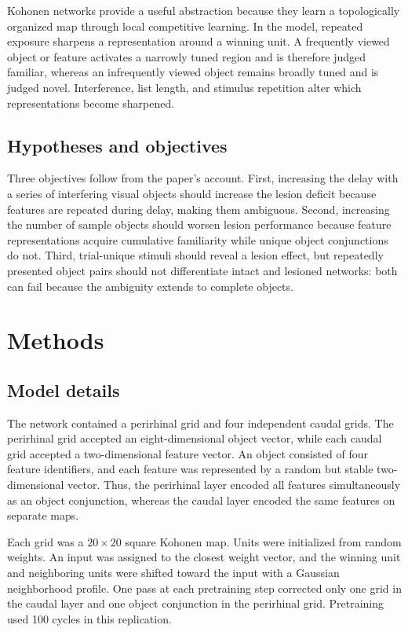 \documentclass[11pt]{article}
\begin{document}
Kohonen networks provide a useful abstraction because they learn a topologically organized map through local competitive learning. In the model, repeated exposure sharpens a representation around a winning unit. A frequently viewed object or feature activates a narrowly tuned region and is therefore judged familiar, whereas an infrequently viewed object remains broadly tuned and is judged novel. Interference, list length, and stimulus repetition alter which representations become sharpened.

\subsection{Hypotheses and objectives}
Three objectives follow from the paper's account. First, increasing the delay with a series of interfering visual objects should increase the lesion deficit because features are repeated during delay, making them ambiguous. Second, increasing the number of sample objects should worsen lesion performance because feature representations acquire cumulative familiarity while unique object conjunctions do not. Third, trial-unique stimuli should reveal a lesion effect, but repeatedly presented object pairs should not differentiate intact and lesioned networks: both can fail because the ambiguity extends to complete objects.

\section{Methods}
\subsection{Model details}
The network contained a perirhinal grid and four independent caudal grids. The perirhinal grid accepted an eight-dimensional object vector, while each caudal grid accepted a two-dimensional feature vector. An object consisted of four feature identifiers, and each feature was represented by a random but stable two-dimensional vector. Thus, the perirhinal layer encoded all features simultaneously as an object conjunction, whereas the caudal layer encoded the same features on separate maps.

Each grid was a $20\times20$ square Kohonen map. Units were initialized from random weights. An input was assigned to the closest weight vector, and the winning unit and neighboring units were shifted toward the input with a Gaussian neighborhood profile. One pass at each pretraining step corrected only one grid in the caudal layer and one object conjunction in the perirhinal grid. Pretraining used 100 cycles in this replication.
\end{document}
